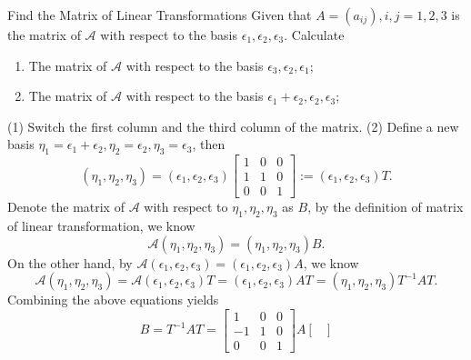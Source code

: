 \begin{example}{Find the Matrix of Linear Transformations}{}
  Given that $A = (a_{ij}), i,j = 1,2,3$ is the matrix of $\mathcal{A}$
  with respect to the basis $\epsilon_1,\epsilon_2,\epsilon_3$. Calculate
  \begin{enumerate}
  \item The matrix of $\mathcal{A}$ with respect to the basis $\epsilon_3, \epsilon_2, \epsilon_1$;
  \item The matrix of $\mathcal{A}$ with respect to the basis $\epsilon_1 + \epsilon_2, \epsilon_2, \epsilon_3$;
  \end{enumerate}
\end{example}

\begin{solution}
  (1) Switch the first column and the third column of the matrix.
  (2) Define a new basis $\eta_1 = \epsilon_1 + \epsilon_2, \eta_2 = \epsilon_2,
  \eta_3 = \epsilon_3$, then
  \begin{equation}
    (\eta_1, \eta_2, \eta_3) = (\epsilon_1, \epsilon_2, \epsilon_3) 
    \begin{bmatrix}
      1 & 0 & 0\\
      1 & 1 & 0\\
      0 & 0 & 1
    \end{bmatrix} := (\epsilon_1, \epsilon_2, \epsilon_3)T.
  \end{equation}
  Denote the matrix of $\mathcal{A}$ with respect to $\eta_1,\eta_2,\eta_3$ as $B$,
  by the definition of matrix of linear transformation, we know
  \begin{equation}
    \mathcal{A}(\eta_1, \eta_2, \eta_3) = (\eta_1, \eta_2, \eta_3) B.
  \end{equation}
  On the other hand, by $\mathcal{A}(\epsilon_1, \epsilon_2, \epsilon_3) =
  (\epsilon_1, \epsilon_2, \epsilon_3)A$, we know
  \begin{equation}
    \mathcal{A}(\eta_1, \eta_2, \eta_3) = \mathcal{A}(\epsilon_1, \epsilon_2, \epsilon_3)T
    = (\epsilon_1, \epsilon_2, \epsilon_3) AT = (\eta_1, \eta_2, \eta_3)T^{-1}AT.
  \end{equation}
  Combining the above equations yields
  \begin{equation}
    B = T^{-1}AT =
    \begin{bmatrix}
      1 & 0 & 0\\
      -1 & 1 & 0\\
      0 & 0 & 1
    \end{bmatrix}A
    \begin{bmatrix}

\end{bmatrix}
\end{equation}
\end{solution}
